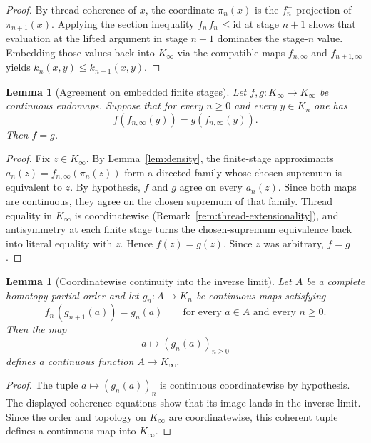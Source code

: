 \documentclass[webpdf,traditional,large,numbered]{oup-authoring-template}
\theoremstyle{thmstyleone}%
\newtheorem{lemma}[theorem]{Lemma}
\theoremstyle{thmstyletwo}%
\theoremstyle{thmstylethree}%
\newcommand{\Kinf}{K_\infty}
\begin{document}
\begin{proof}
  By thread coherence of $x$, the coordinate $\pi_n(x)$ is the
  $f_n^-$-projection of $\pi_{n+1}(x)$.  Applying the section inequality
  $f_n^+f_n^-\le \mathrm{id}$ at stage $n+1$ shows that evaluation at the lifted
  argument in stage $n+1$ dominates the stage-$n$ value.  Embedding those
  values back into $\Kinf$ via the compatible maps $f_{n,\infty}$ and
  $f_{n+1,\infty}$ yields $k_n(x,y)\le k_{n+1}(x,y)$.
\end{proof}

\begin{lemma}[Agreement on embedded finite stages]\label{lem:stage-agreement}
  Let $f,g:\Kinf\to\Kinf$ be continuous endomaps.  Suppose that for every
  $n\ge 0$ and every $y\in K_n$ one has
  \[
    f(f_{n,\infty}(y))=g(f_{n,\infty}(y)).
  \]
  Then $f=g$.
\end{lemma}

\begin{proof}
  Fix $z\in\Kinf$.  By Lemma~\ref{lem:density}, the finite-stage approximants
  $a_n(z)=f_{n,\infty}(\pi_n(z))$ form a directed family whose chosen supremum
  is equivalent to $z$.  By hypothesis, $f$ and $g$ agree on every $a_n(z)$.
  Since both maps are continuous, they agree on the chosen supremum of that
  family.  Thread equality in $\Kinf$ is coordinatewise
  (Remark~\ref{rem:thread-extensionality}), and antisymmetry at each finite
  stage turns the chosen-supremum equivalence back into literal equality with
  $z$.  Hence $f(z)=g(z)$.  Since $z$ was arbitrary, $f=g$.
\end{proof}

\begin{lemma}[Coordinatewise continuity into the inverse limit]\label{lem:coordinatewise-cont}
  Let $A$ be a complete homotopy partial order and let
  $g_n:A\to K_n$ be continuous maps satisfying
  \[
    f_n^-(g_{n+1}(a))=g_n(a)
    \qquad\text{for every }a\in A\text{ and every }n\ge 0.
  \]
  Then the map
  \[
    a\longmapsto (g_n(a))_{n\ge 0}
  \]
  defines a continuous function $A\to\Kinf$.
\end{lemma}

\begin{proof}
  The tuple $a\mapsto (g_n(a))_n$ is continuous coordinatewise by hypothesis.
  The displayed coherence equations show that its image lands in the inverse
  limit.  Since the order and topology on $\Kinf$ are coordinatewise, this
  coherent tuple defines a continuous map into $\Kinf$.
\end{proof}
\end{document}
